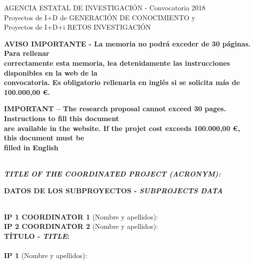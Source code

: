 \documentclass[a4paper,11pt,oneside]{article}
\begin{document}


\begin{tcolorbox}[colback=white,arc=0pt,outer arc=0pt,colframe=black,boxrule=0.6pt]
  \begin{center}
    AGENCIA ESTATAL DE INVESTIGACI\'ON - Convocatoria 2018\\
    Proyectos de I+D de GENERACI\'ON DE CONOCIMIENTO y\\
    Proyectos de I+D+i RETOS INVESTIGACI\'ON
  \end{center}
\end{tcolorbox}
\begin{tcolorbox}[colback=yellow,arc=0pt,outer arc=0pt,colframe=black,boxrule=0.6pt,left=0mm,right=0mm]
  \begin{center}
    {\bf AVISO IMPORTANTE - La memoria no podr\'a exceder de 30 p\'aginas. Para rellenar\\
      correctamente esta memoria, lea detenidamente las instrucciones disponibles en la web de la\\
      convocatoria. Es obligatorio rellenarla en ingl\'es si se solicita m\'as de 100.000,00 \euro.}
  \end{center}
  \begin{center}
    {\bf IMPORTANT -- The research proposal cannot exceed 30 pages. Instructions to fill this document\\
      are available in the website. If the projet cost exceeds 100.000,00 \euro, this document must be\\
      filled in English}
  \end{center}
\end{tcolorbox}
\\
{\bf \emph{TITLE OF THE COORDINATED PROJECT (ACRONYM):}}
\vspace{3pt}
\begin{tcolorbox}[colback=white,arc=0pt,outer arc=0pt,colframe=black,boxrule=0.6pt,left=0mm]
  \textbf{DATOS DE LOS SUBPROYECTOS - \emph{SUBPROJECTS DATA}}
\end{tcolorbox}
\\
{\bf IP 1 COORDINATOR 1} (Nombre y apellidos):\\
{\bf IP 2 COORDINATOR 2} (Nombre y apellidos):\\
{\bf T\'ITULO - \emph{TITLE}:}\\
\\
{\bf IP 1} (Nombre y apellidos):\\
\end{document}
